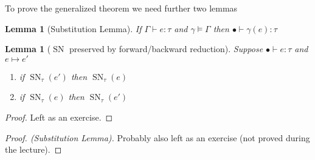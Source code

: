 \documentclass[a4paper,10pt,fleqn]{article}
\DeclareMathOperator{\SNPred}{SN}
\newcommand{\evalto}{\ensuremath{\mapsto}}
\newcommand{\mtenv}{\ensuremath{\bullet}}
\newcommand{\SN}[2]{\ensuremath{\SNPred_{#1}(#2)}}
\newtheorem*{substlem}{Lemma}
\newtheorem*{forback}{Lemma}
\begin{document}
To prove the generalized theorem we need further two lemmas
\begin{substlem}[Substitution Lemma]
  If $\Gamma \vdash e : \tau$ and $\gamma \models \Gamma$ then $\mtenv \vdash \gamma (e) : \tau$
\end{substlem}
\begin{forback}[$\SNPred$ preserved by forward/backward reduction]
  Suppose $\mtenv \vdash e : \tau$ and $e \evalto e'$
  \begin{enumerate}
  \item if $\SN{\tau}{e'}$ then $\SN{\tau}{e}$
  \item if $\SN{\tau}{e}$ then $\SN{\tau}{e'}$
  \end{enumerate}
\end{forback}
\begin{proof}
  Left as an exercise.
\end{proof}
\begin{proof}[Proof. (Substitution Lemma)] 
  Probably also left as an exercise (not proved during the lecture).
\end{proof}
\end{document}
